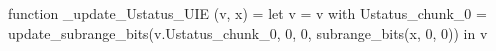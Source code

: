 function _update_Ustatus_UIE (v, x) = let v = { v with Ustatus_chunk_0 = update_subrange_bits(v.Ustatus_chunk_0, 0, 0, subrange_bits(x, 0, 0)) } in
  v
